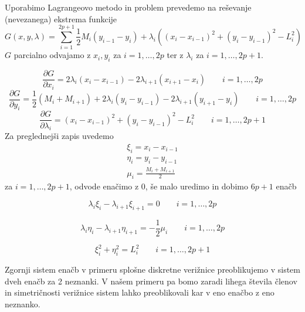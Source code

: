 \documentclass[A4paper, 11pt]{article}
\begin{document}
Uporabimo Lagrangeovo metodo in problem prevedemo na reševanje (nevezanega) ekstrema funkcije
\[ G(x,y,\lambda) = \sum_{i=1}^{2p+1} \frac{1}{2} M_i (y_{i-1} - y_i) + \lambda_i ((x_i - x_{i-1})^2 + (y_i - y_{i-1})^2 - L_i ^2) \]
$G$ parcialno odvajamo z $x_i, y_i$ za $i=1, \ldots, 2p$ ter z $\lambda_i$ za $i=1, \ldots, 2p+1$.

\[ \frac{\partial G}{\partial x_i} = 2\lambda_i (x_i - x_{i-1}) - 2\lambda_{i+1} (x_{i+1} - x_i) \qquad i=1, \ldots, 2p \]
\[ \frac{\partial G}{\partial y_i} = \frac{1}{2} (M_i + M_{i+1}) + 2\lambda_i (y_i - y_{i-1}) - 2\lambda_{i+1} (y_{i+1} - y_i) \qquad  i=1, \ldots, 2p \]
\[ \frac{\partial G}{\partial \lambda_i} = (x_i - x_{i-1})^2 + (y_i - y_{i-1})^2 - L_i ^2 \qquad i=1, \ldots, 2p+1 \]
Za preglednejši zapis uvedemo 
\begin{equation}
\begin{split}
\xi_i = x_i - x_{i-1} \\
\eta_i = y_i - y_{i-1} \\
\mu_i = \frac{M_i + M_{i+1}}{2}
\end{split}
\end{equation}
za $i=1, \ldots, 2p+1$, odvode enačimo z 0, še malo uredimo in dobimo $6p+1$ enačb

\begin{equation}
\lambda_i \xi_i - \lambda_{i+1} \xi_{i+1} = 0 \qquad i=1, \ldots, 2p 
\end{equation}

\begin{equation}
\lambda_i \eta_i - \lambda_{i+1} \eta_{i+1} = - \frac{1}{2} \mu_i \qquad i=1, \ldots, 2p 
\end{equation}

\begin{equation}
\xi_i ^2 + \eta_i ^2 = L_i ^2 \qquad i=1, \ldots, 2p+1 
\end{equation}

Zgornji sistem enačb v primeru splošne diskretne verižnice preoblikujemo v sistem dveh enačb za 2 neznanki. V našem primeru pa bomo zaradi lihega števila členov in simetričnosti verižnice sistem lahko preoblikovali kar v eno enačbo z eno neznanko. 
\end{document}
